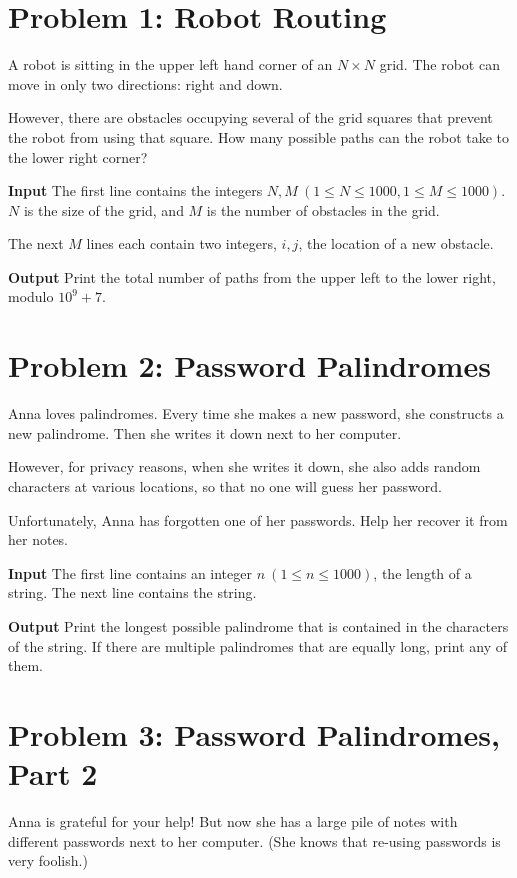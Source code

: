 \normalfont\documentclass[letterpaper,11pt]{article}
\begin{document}
\section*{Problem 1: Robot Routing}
A robot is sitting in the upper left hand corner of an $N \times N$ grid. The robot can move in only two directions: right and down.

However, there are obstacles occupying several of the grid squares that prevent the robot from using that square. How many possible paths can the robot take to the lower right corner?

\textbf{Input} \newline
The first line contains the integers $N, M \ (1 \leq N \leq 1000, 1 \leq M \leq 1000)$. $N$ is the size of the grid, and $M$ is the number of obstacles in the grid.

The next $M$ lines each contain two integers, $i, j$, the location of a new obstacle.

\textbf{Output} \newline
Print the total number of paths from the upper left to the lower right, modulo $10^9 + 7$.

\newpage

\section*{Problem 2: Password Palindromes}
Anna loves palindromes. Every time she makes a new password, she constructs a new palindrome. Then she writes it down next to her computer.

However, for privacy reasons, when she writes it down, she also adds random characters at various locations, so that no one will guess her password.

Unfortunately, Anna has forgotten one of her passwords. Help her recover it from her notes.

\textbf{Input} \newline
The first line contains an integer $n \ (1 \leq n \leq 1000)$, the length of a string. The next line contains the string.

\textbf{Output} \newline
Print the longest possible palindrome that is contained in the characters of the string. If there are multiple palindromes that are equally long, print any of them.

\newpage

\section*{Problem 3: Password Palindromes, Part 2}
Anna is grateful for your help! But now she has a large pile of notes with different passwords next to her computer. (She knows that re-using passwords is very foolish.)
\end{document}
